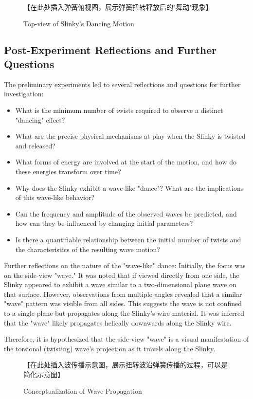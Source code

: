 \documentclass{mcmthesis}  %
\begin{document}
\begin{figure}[h!]
    \centering
    【在此处插入弹簧俯视图，展示弹簧扭转释放后的"舞动"现象】
    \caption{Top-view of Slinky's Dancing Motion}
    \label{fig:top_view_phenomena}
\end{figure}

\subsection{Post-Experiment Reflections and Further Questions} %
The preliminary experiments led to several reflections and questions for further investigation:
\begin{itemize}
    \item What is the minimum number of twists required to observe a distinct "dancing" effect?
    \item What are the precise physical mechanisms at play when the Slinky is twisted and released?
    \item What forms of energy are involved at the start of the motion, and how do these energies transform over time?
    \item Why does the Slinky exhibit a wave-like "dance"? What are the implications of this wave-like behavior?
    \item Can the frequency and amplitude of the observed waves be predicted, and how can they be influenced by changing initial parameters?
    \item Is there a quantifiable relationship between the initial number of twists and the characteristics of the resulting wave motion?
\end{itemize}

Further reflections on the nature of the "wave-like" dance:
Initially, the focus was on the side-view "wave." It was noted that if viewed directly from one side, the Slinky appeared to exhibit a wave similar to a two-dimensional plane wave on that surface. However, observations from multiple angles revealed that a similar "wave" pattern was visible from all sides. This suggests the wave is not confined to a single plane but propagates along the Slinky's wire material. It was inferred that the "wave" likely propagates helically downwards along the Slinky wire.

Therefore, it is hypothesized that the side-view "wave" is a visual manifestation of the torsional (twisting) wave's projection as it travels along the Slinky.

\begin{figure}[h!]
    \centering
    【在此处插入波传播示意图，展示扭转波沿弹簧传播的过程，可以是简化示意图】
    \caption{Conceptualization of Wave Propagation}
    \label{fig:wave_reflection}
\end{figure}
\end{document}
